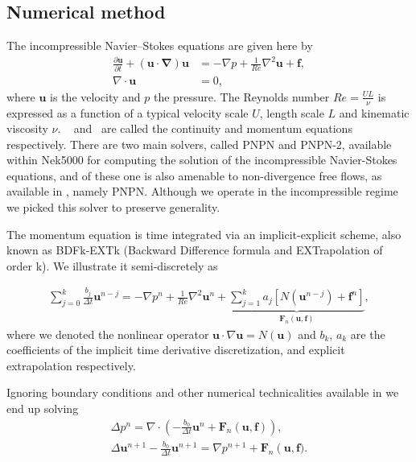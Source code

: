 \documentclass{sig-alternate}
\begin{document}
\subsection{Numerical method}
The incompressible Navier--Stokes equations are given here by
\begin{align} 
 \frac{\partial \mathbf{u}}{\partial t} + (\mathbf{u \cdot \nabla}) \mathbf{u} & = - \nabla p + \frac{1}{Re} \nabla^2 \mathbf{u} + \mathbf{f} \label{eqn:NS_momentum},\\
 \nabla \cdot \mathbf{u} & = 0, \label{eqn:NS_continuity}
\end{align}
where $\mathbf{u}$ is the velocity and $p$ the pressure. The Reynolds number 
$Re = \frac{U L}{\nu}$ is expressed as a function of a typical velocity scale $U$,
length scale $L$ and kinematic viscosity $\nu$. ~ 
and~ are called the continuity and momentum equations 
respectively. There are two main solvers, called PNPN and PNPN-2, available within 
Nek5000 for computing the solution of the incompressible 
Navier-Stokes equations, and of these one is also amenable to non-divergence free 
flows, as available in \cite{Tomboulides1997}, namely PNPN. Although we operate in the incompressible
regime we picked this solver to preserve generality. 

The momentum equation is time integrated via an implicit-explicit scheme, also
known as BDFk-EXTk (Backward Difference formula and EXTrapolation of order k). We
illustrate it semi-discretely as

\begin{eqnarray}
\sum\limits_{j=0}^k \frac{b_j}{\Delta t} \mathbf u^{n-j}  = - \nabla p^{n}+\frac{1}{Re}\nabla^2\mathbf u^{n}+\underbrace{\sum\limits_{j=1}^k a_j [N(\mathbf u^{n-j})+\mathbf f^{n}]}_{\mathbf{F}_n(\mathbf u,\mathbf f)},\label{eqn:discrete}
\end{eqnarray}
where we denoted the nonlinear operator $\mathbf u \cdot \nabla \mathbf u=N(\mathbf u)$ and $b_k$, $a_k$ are the coefficients of the implicit time derivative discretization, and explicit extrapolation respectively.

Ignoring boundary conditions and other numerical technicalities available in \cite{Tomboulides1997} we end up solving
\begin{eqnarray}
 \Delta p^{n} = \nabla \cdot \left( -\frac{b_0}{\Delta t} \mathbf{u}^{n} + \mathbf{F}_n \left( \mathbf{u},\mathbf f \right) \right), \label{eqn:hmhz_pres}\\
 \Delta \mathbf{u}^{n+1}- \frac{b_0}{\Delta t} \mathbf{u}^{n+1}  =  \nabla p^{n+1} + \mathbf{F}_n \left( \mathbf{u}, \mathbf f) \right. . \label{eqn:hmhz_vel}
\end{eqnarray}
\end{document}
